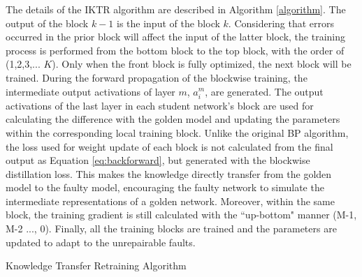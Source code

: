 The details of the IKTR algorithm are described in Algorithm \ref{algorithm}. The output of the block $k-1$ is the input of the  block $k$. Considering that errors occurred in the prior block will affect the input of the latter block, the training process is performed from the bottom block to the top block, with the order of (1,2,3,... $K$). Only when the front block is fully optimized, the next block will be trained. During the forward propagation of the blockwise training, the intermediate output activations of layer $m$, $a_{i}^m$, are generated. The output activations of the last layer in each student network's block are used for calculating the difference with the golden model and updating the parameters within the corresponding local training block. Unlike the original BP algorithm, the loss used for weight update of each block is not calculated from the final output as Equation \ref{eq:backforward}, but generated with the blockwise distillation loss. This makes the knowledge directly transfer from the golden model to the faulty model, encouraging the faulty network to simulate the intermediate representations of a golden network. Moreover, within the same block, the training gradient is still calculated with the ``up-bottom" manner (M-1, M-2 ..., 0). Finally, all the training blocks are trained and the parameters are updated to adapt to the unrepairable faults.

\begin{algorithm} 
    \caption{Knowledge Transfer Retraining Algorithm}\label{algorithm}
\end{algorithm}

